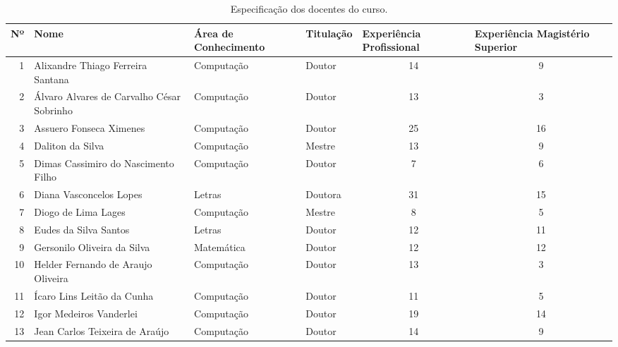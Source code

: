 \documentclass[
	12pt,				%
	openright,			%
  oneside,     %
	a4paper,			%
	chapter=TITLE,		%
	english,			%
	french,				%
	spanish,			%
	brazil				%
	]{abntex2}
\begin{document}
\begin{center}
  
  \begin{scriptsize}
    \begin{longtable}{rp{6cm}p{1.8cm}p{1.4cm}p{1.9cm}p{1.8cm}}
      \caption{\label{quadro:especificacao-dos-docentes-curso}Especificação dos docentes do curso.}\\
    \toprule
    \textbf{Nº} & \textbf{Nome} & \textbf{Área de Conhecimento} & \textbf{Titulação} & \textbf{Experiência Profissional} & \textbf{Experiência Magistério Superior}\\ 
    \midrule
    1 & Alixandre Thiago Ferreira Santana & Computação & Doutor & \multicolumn{1}{c}{14} & \multicolumn{1}{c}{9}\\ \midrule
    2 & Álvaro Alvares de Carvalho César Sobrinho & Computação & Doutor & \multicolumn{1}{c}{13} & \multicolumn{1}{c}{3} \\ \midrule
    3 & Assuero Fonseca Ximenes & Computação & Doutor & \multicolumn{1}{c}{25} & \multicolumn{1}{c}{16}\\ \midrule
    4 & Daliton da Silva & Computação & Mestre & \multicolumn{1}{c}{13} & \multicolumn{1}{c}{9} \\ \midrule
    5 & Dimas Cassimiro do Nascimento Filho & Computação & Doutor & \multicolumn{1}{c}{7} & \multicolumn{1}{c}{6} \\ \midrule
    6 & Diana Vasconcelos Lopes  & Letras & Doutora & \multicolumn{1}{c}{31} & \multicolumn{1}{c}{15} \\ \midrule
    7 & Diogo de Lima Lages & Computação & Mestre & \multicolumn{1}{c}{8} & \multicolumn{1}{c}{5} \\ \midrule
    8 & Eudes da Silva Santos & Letras & Doutor & \multicolumn{1}{c}{12} & \multicolumn{1}{c}{11}\\ \midrule
    9 & Gersonilo Oliveira da Silva & Matemática & Doutor & \multicolumn{1}{c}{12} & \multicolumn{1}{c}{12}\\ \midrule
    10 & Helder Fernando de Araujo Oliveira & Computação & Doutor & \multicolumn{1}{c}{13} & \multicolumn{1}{c}{3}\\ \midrule
    11 & Ícaro Lins Leitão da Cunha & Computação & Doutor & \multicolumn{1}{c}{11} & \multicolumn{1}{c}{5}\\ \midrule
    12 & Igor Medeiros Vanderlei & Computação & Doutor & \multicolumn{1}{c}{19} & \multicolumn{1}{c}{14}\\ \midrule
    13 & Jean Carlos Teixeira de Araújo & Computação & Doutor & \multicolumn{1}{c}{14} & \multicolumn{1}{c}{9}\\ \midrule

\end{longtable}
\end{scriptsize}
\end{center}
\end{document}
